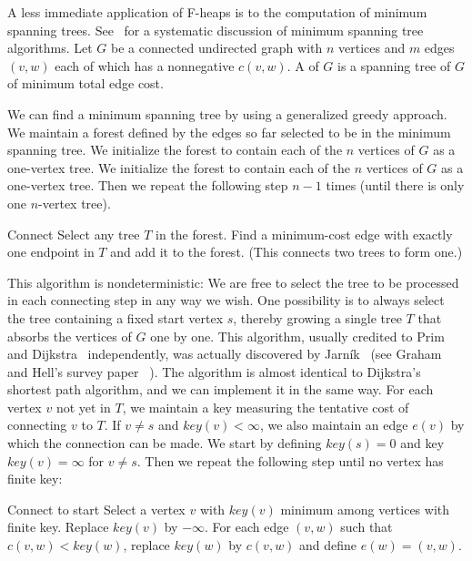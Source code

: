 A less immediate application of F-heaps is to the computation of minimum spanning
trees. See~\cite{Tarjan1983} for a systematic discussion of minimum spanning tree
algorithms. Let \(G\) be a connected undirected graph with \(n\) vertices and \(m\)
edges \((v, w)\) each of which has a nonnegative  \(c(v, w)\).
A  of \(G\) is a spanning tree of \(G\) of minimum total
edge cost.

We can find a minimum spanning tree by using a generalized greedy approach. We
maintain a forest defined by the edges so far selected to be in the minimum spanning
tree. We initialize the forest to contain each of the \(n\) vertices of \(G\) as
a one-vertex tree. We initialize the forest to contain each of the \(n\) vertices of
\(G\) as a one-vertex tree. Then we repeat the following step \(n - 1\) times (until
there is only one \(n\)-vertex tree).

\begin{step}{Connect}
    Select any tree \(T\) in the forest. Find a minimum-cost edge with exactly one
    endpoint in \(T\) and add it to the forest. (This connects two trees to form
    one.)
\end{step}

This algorithm is nondeterministic: We are free to select the tree to be processed in
each connecting step in any way we wish. One possibility is to always select the tree
containing a fixed start vertex \(s\), thereby growing a single tree \(T\) that
absorbs the vertices of \(G\) one by one. This algorithm, usually credited to Prim~%
\cite{Prim1957} and Dijkstra~\cite{Dijkstra1959} independently, was actually
discovered by Jarník~\cite{Jarnik1930} (see Graham and Hell's survey paper~%
\cite{GrahamHell1985}). The algorithm is almost identical to Dijkstra's shortest path
algorithm, and we can implement it in the same way. For each vertex \(v\) not yet in
\(T\), we maintain a key measuring the tentative cost of connecting \(v\) to \(T\).
If \(v \neq s\) and \(key(v) < \infty\), we also maintain an edge \(e(v)\) by which
the connection can be made. We start by defining \(key(s) = 0\) and key \(key(v)
= \infty\) for \(v \neq s\). Then we repeat the following step until no vertex has
finite key:

\begin{step}{Connect to start}
    Select a vertex \(v\) with \(key(v)\) minimum among vertices with finite key.
    Replace \(key(v)\) by \(-\infty\). For each edge \((v, w)\) such that \(c(v, w)
    < key(w)\), replace \(key(w)\) by \(c(v, w)\) and define \(e(w) = (v, w)\).
\end{step}

